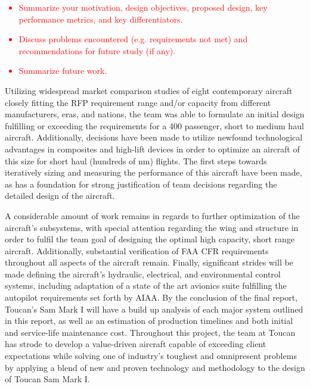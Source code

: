 \textcolor{red}{
\begin{itemize}
    \item Summarize your motivation, design objectives, proposed design, key performance metrics, and key differentiators. 
    \item Discuss problems encountered (e.g. requirements not met) and recommendations for future study (if any). 
    \item Summarize future work. 
\end{itemize}}

Utilizing widespread market comparison studies of eight contemporary aircraft closely fitting the RFP requirement range and/or capacity from different manufacturers, eras, and nations, the team was able to formulate an initial design fulfilling or exceeding the requirements for a 400 passenger, short to medium haul aircraft. Additionally, decisions have been made to utilize newfound technological advantages in composites and high-lift devices in order to optimize  an aircraft of this size for short haul (hundreds of nm) flights.  The first steps towards iteratively sizing and measuring the performance of this aircraft have been made, as has a foundation for strong justification of team decisions regarding the detailed design of the aircraft.

A considerable amount of work remains in regards to further optimization of the aircraft's subsystems, with special attention regarding the wing and structure in order to fulfil the team goal of designing the optimal high capacity, short range aircraft.  Additionally, substantial verification of FAA CFR requirements throughout all aspects of the aircraft remain.  Finally, significant strides will be made defining the aircraft's hydraulic, electrical, and environmental control systems, including adaptation of a state of the art avionics suite fulfilling the autopilot requirements set forth by AIAA.  By the conclusion of the final report, Toucan's Sam Mark I will have a build up analysis of each major system outlined in this report, as well as an estimation of production timelines and both initial and service-life maintenance cost.  Throughout this project, the team at Toucan has strode to develop a value-driven aircraft capable of exceeding client expectations while solving one of industry's toughest and omnipresent problems by applying a blend of new and proven technology and methodology to the design of Toucan Sam Mark I.  